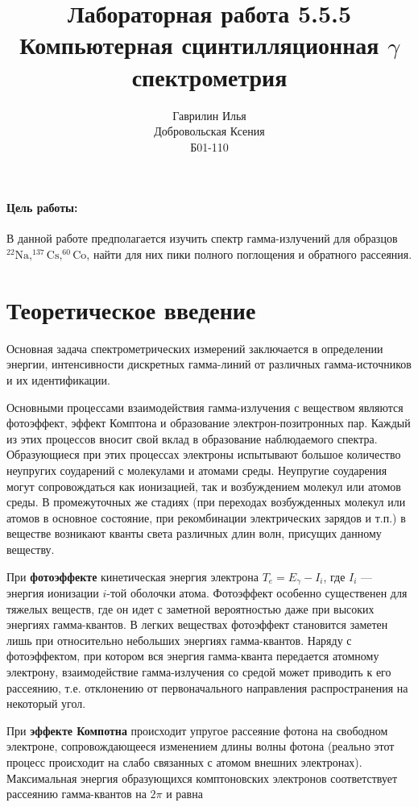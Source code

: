 \documentclass[a4paper,12pt]{article} %
\author{Гаврилин Илья\\
	Добровольская Ксения\\
	Б01-110}
\title{\textbf{Лабораторная работа 5.5.5\\ 
		Компьютерная сцинтилляционная $\gamma$ спектрометрия}}
\newcommand{\ga}{\ensuremath{\gamma}}
\begin{document}
	\maketitle
	
	\paragraph*{Цель работы:} В данной работе предполагается изучить спектр гамма-излучений для образцов $ \mathrm{^{22}Na, ^{137}Cs, ^{60}Co }$, найти для них пики полного поглощения и обратного рассеяния.
	
	
	
	\section{Теоретическое введение}
	
	Основная задача спектрометрических измерений заключается в определении энергии, интенсивности дискретных гамма-линий от различных гамма-источников и их идентификации.
	
	Основными процессами взаимодействия гамма-излучения с веществом являются фотоэффект, эффект Комптона и образование электрон-позитронных пар. Каждый из этих процессов вносит свой вклад в образование наблюдаемого спектра. Образующиеся при этих процессах электроны испытывают большое количество неупругих соударений с молекулами и атомами среды. Неупругие соударения могут сопровождаться как ионизацией, так и возбуждением молекул или атомов среды. В промежуточных же стадиях (при переходах возбужденных молекул или атомов в основное состояние, при рекомбинации электрических зарядов и т.п.) в веществе возникают кванты света различных длин волн, присущих данному веществу.
	
	При \textbf{фотоэффекте} кинетическая энергия электрона $ T_e = E_\ga - I_i $, где $ I_i $ --- энергия ионизации $ i $-той оболочки атома. Фотоэффект особенно существенен для тяжелых веществ, где он идет с заметной вероятностью даже при высоких энергиях гамма-квантов. В легких веществах фотоэффект становится заметен лишь при относительно небольших энергиях гамма-квантов. Наряду с фотоэффектом, при котором вся энергия гамма-кванта передается атомному электрону, взаимодействие гамма-излучения со средой может приводить к его рассеянию, т.е. отклонению от первоначального направления распространения на некоторый угол.
	
	При \textbf{эффекте Компотна} происходит упругое рассеяние фотона на свободном электроне, сопровождающееся изменением длины волны фотона (реально этот процесс происходит на слабо связанных с атомом внешних электронах). Максимальная энергия образующихся комптоновских электронов соответствует рассеянию гамма-квантов на $ 2\pi $ и равна
	
\end{document}
